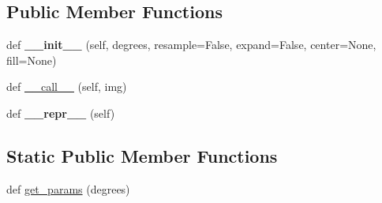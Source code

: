 \subsection*{Public Member Functions}
\begin{DoxyCompactItemize}
\item 
\mbox{\label{classtorchvision_1_1transforms_1_1transforms_1_1RandomRotation_acf9a15757c0d2154171f35b713fd34b8}} 
def {\bfseries \+\_\+\+\_\+init\+\_\+\+\_\+} (self, degrees, resample=False, expand=False, center=None, fill=None)
\item 
def \hyperlink{classtorchvision_1_1transforms_1_1transforms_1_1RandomRotation_a92a652ef4404b753d4356108efc8c431}{\+\_\+\+\_\+call\+\_\+\+\_\+} (self, img)
\item 
\mbox{\label{classtorchvision_1_1transforms_1_1transforms_1_1RandomRotation_a3d5b7f95eade6a2686a8dbb9e5bec6e8}} 
def {\bfseries \+\_\+\+\_\+repr\+\_\+\+\_\+} (self)
\end{DoxyCompactItemize}
\subsection*{Static Public Member Functions}
\begin{DoxyCompactItemize}
\item 
def \hyperlink{classtorchvision_1_1transforms_1_1transforms_1_1RandomRotation_a6932f969e642e146b9517b2df193b317}{get\+\_\+params} (degrees)
\end{DoxyCompactItemize}
